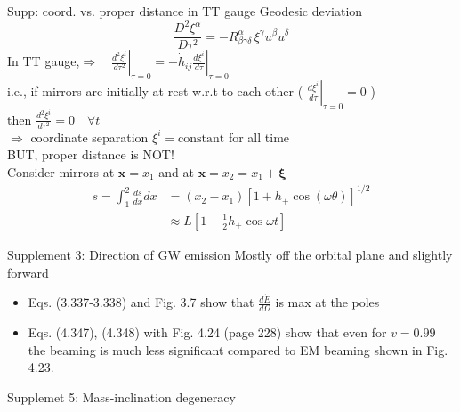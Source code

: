\documentclass[xcolor=dvipsnames,handout,t]{beamer}
\renewcommand{\t}{\theta}
\begin{document}
\begin{frame}{Supp: coord. vs. proper distance in TT gauge}
  Geodesic deviation 
  \[
   \frac{D^2 \xi^\alpha}{D\tau^2} = -R^\alpha_{\beta \gamma\delta}\, \xi^\gamma u^\beta u^\delta 
  \]
In TT gauge,\qquad  $\Longrightarrow \quad\left.\tfrac{d^2 \xi^i}{d\tau^2}\right|_{\tau=0} = -\left. \dot{h}_{ij} \tfrac{d\xi^i}{d\tau}\right|_{\tau=0}$\\
i.e., if mirrors are initially at rest w.r.t to each other ( $\left. \tfrac{d\xi^i}{d\tau}\right|_{\tau=0} =0$ )\\
then $\tfrac{d^2 \xi^i}{d\tau^2}=0\quad \forall t$ \\
$\Longrightarrow$ coordinate separation $\xi^i = \text{constant}$ for all time \\
BUT, proper distance is NOT! \\
Consider mirrors at $\mathbf{x}=x_1$ and at $\mathbf{x}=x_2=x_1+\mathbf{\xi}$
\begin{align*}
  s = \int_1^2 \tfrac{ds}{dx}dx &= (x_2-x_1) \left[ 1 + h_+ \cos(\omega\t)\right]^{1/2} \\
			      & \approx L \left[ 1+\tfrac{1}{2} h_+ \cos\omega t \right] 
\end{align*}
 \end{frame}



\begin{frame}{Supplement 3: Direction of GW emission}
 Mostly off the orbital plane and slightly forward
 \begin{itemize}
  \item Eqs. (3.337-3.338) and Fig. 3.7 show that $\tfrac{d\dot{E}}{d\Omega}$ is max at the poles
  \item Eqs. (4.347), (4.348) with Fig. 4.24 (page 228) show that even for $v=0.99$ the beaming
  is much less significant compared to EM beaming shown in Fig. 4.23.
 \end{itemize}

\end{frame}


\begin{frame}{Supplemet 5: Mass-inclination degeneracy}
 
\end{frame}
\end{document}
